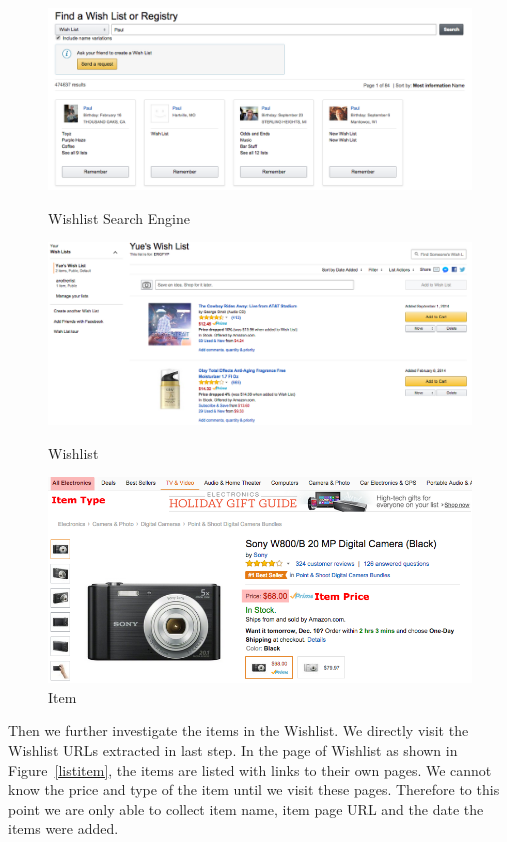 \begin{figure}[!htb]
  \includegraphics[width=\linewidth]{searcheng.png}
  \caption{Wishlist Search Engine}\label{searcheng}
\endminipage\hfill
{}
  \includegraphics[width=\linewidth]{listitem.png}
  \caption{Wishlist}\label{listitem}
\endminipage\hfill
{}%
  \includegraphics[width=\linewidth]{item.png}
  \caption{Item}\label{item}
\endminipage
\end{figure}

Then we further investigate the items in the Wishlist. We directly visit the Wishlist URLs extracted in last step. In the page of Wishlist as shown in Figure~\ref{listitem}, the items are listed with links to their own pages. We cannot know the price and type of the item until we visit these pages. Therefore to this point we are only able to collect item name, item page URL and the date the items were added. 

